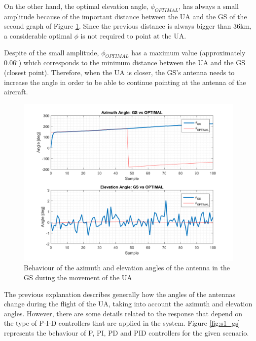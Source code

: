 On the other hand, the optimal elevation angle, $\phi_{OPTIMAL}$, has always a small amplitude because of the important distance between the UA and the GS of the second graph of Figure \ref{fig:s1_pd_gs_alone}. Since the previous distance is always bigger than 36km, a considerable optimal $\phi$ is not required to point at the UA. 

Despite of the small amplitude, $\phi_{OPTIMAL}$ has a maximum value (approximately 0.06$^{\circ}$) which corresponds to the minimum distance between the UA and the GS (closest point). Therefore, when the UA is closer, the GS’s antenna needs to increase the angle in order to be able to continue pointing at the antenna of the aircraft.

\begin{figure}[H]
	\centering
	\includegraphics[scale=0.75]{figures/s1_pd_gs.png}
	\caption{Behaviour of the azimuth and elevation angles of the antenna in the GS during the movement of the UA}
	\label{fig:s1_pd_gs_alone}
\end{figure}

The previous explanation describes generally how the angles of the antennas change during the flight of the UA, taking into account the azimuth and elevation angles. However, there are some details related to the response that depend on the type of P-I-D controllers that are applied in the system. Figure \ref{fig:s1_gs} represents the behaviour of P, PI, PD and PID controllers for the given scenario.


